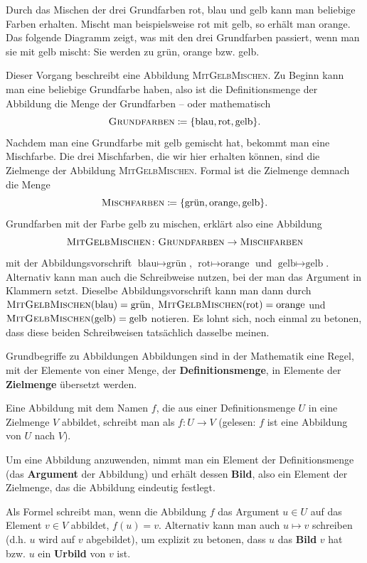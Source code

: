 \documentclass[../../main.tex]{subfiles}
\begin{document}
\begin{example}
    Durch das Mischen der drei Grundfarben rot, blau und gelb kann man beliebige Farben erhalten. Mischt man beispielsweise rot mit gelb, so erhält man orange. Das folgende Diagramm zeigt, was mit den drei Grundfarben passiert, wenn man sie mit gelb mischt: Sie werden zu grün, orange bzw. gelb.
    \begin{center}
    \end{center}
    Dieser Vorgang beschreibt eine Abbildung \textsc{MitGelbMischen}. Zu Beginn kann man eine beliebige Grundfarbe haben, also ist die Definitionsmenge der Abbildung die Menge der Grundfarben -- oder mathematisch \[\textsc{Grundfarben}\coloneqq\{\text{blau},\text{rot},\text{gelb}\}.\]
    Nachdem man eine Grundfarbe mit gelb gemischt hat, bekommt man eine Mischfarbe. Die drei Mischfarben, die wir hier erhalten können, sind die Zielmenge der Abbildung \textsc{MitGelbMischen}. Formal ist die Zielmenge demnach die Menge \[\textsc{Mischfarben}\coloneqq\{\text{grün},\text{orange},\text{gelb}\}.\]
    Grundfarben mit der Farbe gelb zu mischen, erklärt also eine Abbildung \[\textsc{MitGelbMischen}\colon\textsc{Grundfarben}\rightarrow\textsc{Mischfarben}\] mit der Abbildungsvorschrift $\text{blau}\mapsto\text{grün}$, $\text{rot}\mapsto\text{orange}$ und $\text{gelb}\mapsto\text{gelb}$. Alternativ kann man auch die Schreibweise nutzen, bei der man das Argument in Klammern setzt. Dieselbe Abbildungsvorschrift kann man dann durch $\textsc{MitGelbMischen}(\text{blau})=\text{grün}$, $\textsc{MitGelbMischen}(\text{rot})=\text{orange}$ und $\textsc{MitGelbMischen}(\text{gelb})=\text{gelb}$ notieren. Es lohnt sich, noch einmal zu betonen, dass diese beiden Schreibweisen tatsächlich dasselbe meinen.
\end{example}

\begin{nutshell}{Grundbegriffe zu Abbildungen}
    \parpic[r]{
    }
    Abbildungen sind in der Mathematik eine Regel, mit der Elemente von einer Menge, der \textbf{Definitionsmenge}, in Elemente der \textbf{Zielmenge} übersetzt werden.
    
    Eine Abbildung mit dem Namen $f$, die aus einer Definitionsmenge $U$ in eine Zielmenge $V$ abbildet, schreibt man als $f\colon U\rightarrow V$ (gelesen: $f$ ist eine Abbildung von $U$ nach $V$).
    
    Um eine Abbildung anzuwenden, nimmt man ein Element der Definitionsmenge (das \textbf{Argument} der Abbildung) und erhält dessen \textbf{Bild}, also ein Element der Zielmenge, das die Abbildung eindeutig festlegt. 
    
    Als Formel schreibt man, wenn die Abbildung $f$ das Argument $u\in U$ auf das Element $v\in V$ abbildet, $f(u)=v$. Alternativ kann man auch $u\mapsto v$ schreiben (d.h. $u$ wird auf $v$ abgebildet), um explizit zu betonen, dass $u$ das \textbf{Bild} $v$ hat bzw. $u$ ein \textbf{Urbild} von $v$ ist.
\end{nutshell}
\end{document}
